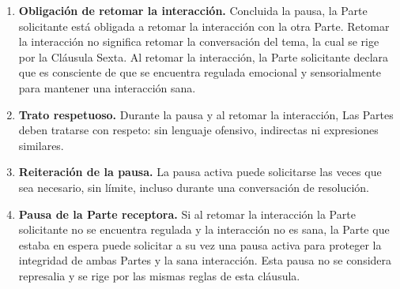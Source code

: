 \begin{enumerate}[label=\arabic*., leftmargin=*, itemsep=0.3em]
  \item \textbf{Obligación de retomar la interacción.} Concluida la pausa, la Parte solicitante está obligada a retomar la interacción con la otra Parte. Retomar la interacción no significa retomar la conversación del tema, la cual se rige por la Cláusula Sexta. Al retomar la interacción, la Parte solicitante declara que es consciente de que se encuentra regulada emocional y sensorialmente para mantener una interacción sana.

  \item \textbf{Trato respetuoso.} Durante la pausa y al retomar la interacción, Las Partes deben tratarse con respeto: sin lenguaje ofensivo, indirectas ni expresiones similares.

  \item \textbf{Reiteración de la pausa.} La pausa activa puede solicitarse las veces que sea necesario, sin límite, incluso durante una conversación de resolución.

  \item \textbf{Pausa de la Parte receptora.} Si al retomar la interacción la Parte solicitante no se encuentra regulada y la interacción no es sana, la Parte que estaba en espera puede solicitar a su vez una pausa activa para proteger la integridad de ambas Partes y la sana interacción. Esta pausa no se considera represalia y se rige por las mismas reglas de esta cláusula.
\end{enumerate}



